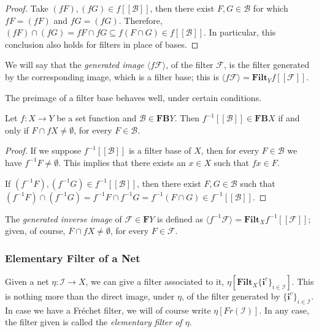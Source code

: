 \documentclass [12pt]{book}
\begin{document}
\begin{proof}Take $(fF),(fG)\in f[[\mathcal{B}]]$, then there exist $F,G\in\mathcal{B}$ for which $fF=(fF)$ and $fG=(fG)$. Therefore, $(fF)\cap(fG)=fF\cap fG\subseteq f(F\cap G)\in f[[\mathcal{B}]]$. In particular, this conclusion also holds for filters in place of bases.\end{proof}

We will say that the \textit{generated image} $\langle f\mathcal{F}\rangle$, of the filter $\mathcal{F}$, is the filter generated by the corresponding image, which is a filter base; this is $\langle f\mathcal{F}\rangle=\textbf{Filt}_Y{f[[\mathcal{F}]]}$.

The preimage of a filter base behaves well, under certain conditions.

\begin{proposition}Let $f:X\rightarrow Y$ be a set function and $\mathcal{B}\in\textbf{FB}Y$. Then $f^{-1}[[\mathcal{B}]]\in\textbf{FB}X$ if and only if $F\cap fX\neq\emptyset$, for every $F\in\mathcal{B}$.\end{proposition}

\begin{proof}If we suppose $f^{-1}[[\mathcal{B}]]$ is a filter base of $X$, then for every $F\in\mathcal{B}$ we have $f^{-1}F\neq\emptyset$. This implies that there exists an $x\in X$ such that $fx\in F$.

If $(f^{-1}F),(f^{-1}G)\in f^{-1}[[\mathcal{B}]]$, then there exist $F,G\in\mathcal{B}$ such that $(f^{-1}F)\cap(f^{-1}G)=f^{-1}F\cap f^{-1}G=f^{-1}(F\cap G)\in f^{-1}[[\mathcal{B}]]$.\end{proof}

The \textit{generated inverse image} of $\mathcal{F}\in\textbf{F}Y$ is defined as $\langle f^{-1}\mathcal{F}\rangle=\textbf{Filt}_Xf^{-1}[[\mathcal{F}]]$; given, of course, $F\cap fX\neq\emptyset$, for every $F\in\mathcal{F}$.

\subsubsection{Elementary Filter of a Net} Given a net $\eta:\mathcal I\rightarrow X$, we can give a filter associated to it, $\eta[\textbf{Filt}_X\{\textbf{i}^c\}_{i\in\mathcal{I}}]$. This is nothing more than the direct image, under $\eta$, of the filter generated by $\{\textbf{i}^c\}_{i\in\mathcal{I}}$. In case we have a Fr\'echet filter, we will of course write $\eta[Fr(\mathcal{I})]$. In any case, the filter given is called the \textit{elementary filter of $\eta$}.
\end{document}

